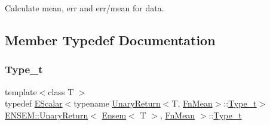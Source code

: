 Calculate mean, err and err/mean for data. 

\subsection{Member Typedef Documentation}
\mbox{\label{structENSEM_1_1UnaryReturn_3_01Ensem_3_01T_01_4_00_01FnMean_01_4_aecb00ba039f774eb3f7e9c0d788867a6}} 
\subsubsection{\texorpdfstring{Type\_t}{Type\_t}\hspace{0.1cm}{\footnotesize\ttfamily [1/2]}}
{\footnotesize\ttfamily template$<$class T $>$ \\
typedef \mbox{\hyperlink{classENSEM_1_1EScalar}{E\+Scalar}}$<$typename \mbox{\hyperlink{structENSEM_1_1UnaryReturn}{Unary\+Return}}$<$T, \mbox{\hyperlink{structENSEM_1_1FnMean}{Fn\+Mean}}$>$\+::\mbox{\hyperlink{structENSEM_1_1UnaryReturn_3_01Ensem_3_01T_01_4_00_01FnMean_01_4_aecb00ba039f774eb3f7e9c0d788867a6}{Type\+\_\+t}}$>$ \mbox{\hyperlink{structENSEM_1_1UnaryReturn}{E\+N\+S\+E\+M\+::\+Unary\+Return}}$<$ \mbox{\hyperlink{classENSEM_1_1Ensem}{Ensem}}$<$ T $>$, \mbox{\hyperlink{structENSEM_1_1FnMean}{Fn\+Mean}} $>$\+::\mbox{\hyperlink{structENSEM_1_1UnaryReturn_3_01Ensem_3_01T_01_4_00_01FnMean_01_4_aecb00ba039f774eb3f7e9c0d788867a6}{Type\+\_\+t}}}

\mbox{\label{structENSEM_1_1UnaryReturn_3_01Ensem_3_01T_01_4_00_01FnMean_01_4_aecb00ba039f774eb3f7e9c0d788867a6}} 
